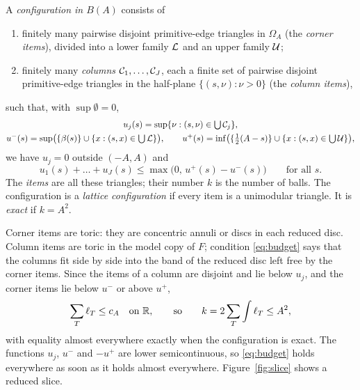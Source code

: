 \documentclass[11pt]{amsart}
\begin{document}
\begin{definition}\label{def:config}
A \emph{configuration in $B(A)$} consists of
\begin{enumerate}[label=(\roman*),leftmargin=2em]
\item finitely many pairwise disjoint primitive-edge triangles in $\Omega_A$ (the \emph{corner items}), divided into a
  lower family $\mathcal{L}$ and an upper family $\mathcal{U}$;
\item finitely many \emph{columns} $\mathcal{C}_1,\dots,\mathcal{C}_J$, each a finite set of pairwise disjoint primitive-edge triangles
  in the half-plane $\{(s,\nu):\nu>0\}$ (the \emph{column items}),
\end{enumerate}
such that, with $\sup\emptyset=0$,
\begin{gather*}
u_j(s)=\sup\{\nu:(s,\nu)\in\textstyle\bigcup\mathcal{C}_j\},\\
u^-(s)=\sup\bigl(\{\beta(s)\}\cup\{x:(s,x)\in\textstyle\bigcup\mathcal{L}\}\bigr),\qquad
u^+(s)=\inf\bigl(\{\tfrac12(A-s)\}\cup\{x:(s,x)\in\textstyle\bigcup\mathcal{U}\}\bigr),
\end{gather*}
we have $u_j=0$ outside $(-A,A)$ and
\begin{equation}\label{eq:budget}
u_1(s)+\dots+u_J(s)\le\max\bigl(0,\,u^+(s)-u^-(s)\bigr)\qquad\text{for all }s.
\end{equation}
The \emph{items} are all these triangles; their number $k$ is the number of balls. The configuration is a
\emph{lattice configuration} if every item is a unimodular triangle. It is \emph{exact} if $k=A^2$.
\end{definition}

Corner items are toric: they are concentric annuli or discs in each reduced disc. Column items are toric in the
model copy of $F$; condition \eqref{eq:budget} says that the columns fit side by side into the band of the reduced
disc left free by the corner items. Since the items of a column are disjoint and lie below $u_j$, and the corner
items lie below $u^-$ or above $u^+$,
\begin{equation}\label{eq:bookkeeping}
\sum_{T}\ell_T\le c_A\quad\text{on }\mathbb{R},\qquad\text{so}\qquad k=2\sum_T\int\ell_T\le A^2,
\end{equation}
with equality almost everywhere exactly when the configuration is exact. The functions $u_j$, $u^-$ and $-u^+$ are
lower semicontinuous, so \eqref{eq:budget} holds everywhere as soon as it holds almost everywhere.
Figure~\ref{fig:slice} shows a reduced slice.
\end{document}
